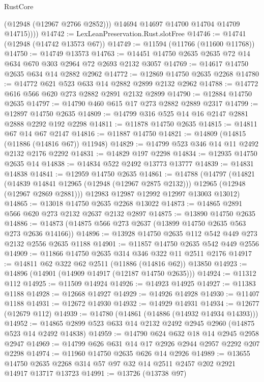 \begin{lexlean}{RustCore}
\begin{coremodule}
              (@12948 (@12967 @2766 @2852)))
            @14694
            @14697
            @14700
            @14704
            @14709
            @14715))))
@14742 := LexLeanPreservation.Rust.slotFree
@14746 := @14741 (@12948 (@14742 @13573 @67))
@14749 := @11594 (@11766 (@11600 @11768))
@14750 := @14749 @13573
@14763 := @14451 @14750 @2635 @2635 @72 @14 @634 @670 @303 @2964 @72 @2693 @2132 @3057
@14769 := @14617 @14750 @2635 @634 @14 @2882 @2962
@14772 := @12869 @14750 @2635 @2268
@14780 := @14772 @621 @523 @633 @14 @2882 @2899 @2132 @2962
@14788 := @14772 @616 @566 @620 @273 @2882 @2891 @2132 @2899
@14790 := @12884 @14750 @2635
@14797 := @14790 @460 @615 @17 @273 @2882 @2889 @2317
@14799 := @12897 @14750 @2635
@14809 := @14799 @316 @525 @14 @16 @2147 @2881 @2888 @2292 @192 @2298
@14811 := @11878 @14750 @2635
@14815 := @14811 @67 @14 @67 @2147
@14816 := @11887 @14750
@14821 := @14809 (@14815 (@11886 (@14816 @67)) @11948)
@14829 := @14799 @523 @346 @14 @11 @2492 @2132 @2176 @2292
@14831 := @14829 @197 @2298
@14834 := @12935 @14750 @2635 @14
@14838 := @14834 @522 @2492 @13773 @13777
@14839 := @14831 @14838
@14841 := @12959 @14750 @2635
@14861 := @14788
    (@14797
      (@14821
        (@14839 @14841 @12965 (@12948 (@12967 @2875 @2132)))
        @12965
        (@12948 (@12967 @2869 @2881)))
      @12983
      @12987
      @12992
      @12997
      @13003
      @13012)
@14865 := @13018 @14750 @2635 @2268 @13022
@14873 := @14865 @2891 @566 @620 @273 @2132 @2637 @2132 @2897
@14875 := @13890 @14750 @2635
@14886 := @14873 (@14875 @566 @273 @2637 (@13899 @14750 @2635 @563 @273 @2636 @14166))
@14896 := @13928 @14750 @2635 @112 @542 @449 @273 @2132 @2556 @2635 @1188
@14901 := @11857 @14750 @2635 @542 @449 @2556
@14909 := @11866 @14750 @2635 @314 @346 @322 @11 @2511 @2176
@14917 := @14811 @62 @322 @62 @2511 (@11886 (@14816 @62)) @13850
@14923 := @14896 (@14901 (@14909 @14917 (@12187 @14750 @2635)))
@14924 := @11312 @112
@14925 := @11509 @14924
@14926 := @14923 @14925
@14927 := @11383 @1188
@14928 := @12668 @14927
@14929 := @14926 @14928
@14930 := @11407 @1188
@14931 := @12672 @14930
@14932 := @14929 @14931
@14934 := @12677 (@12679 @112)
@14939 := @14780 (@14861 (@14886 (@14932 @14934 @14393)))
@14952 := @14865 @2899 @523 @633 @14 @2132 @2492 @2945 @2960 (@14875 @523 @14 @2492 @14838)
@14959 := @14790 @624 @632 @18 @14 @2945 @2958 @2947
@14969 := @14799 @626 @631 @14 @17 @2926 @2944 @2957 @2292 @207 @2298
@14974 := @11960 @14750 @2635 @626 @14 @2926
@14989 := @13655 @14750 @2635 @2268 @314 @57 @97 @32 @14 @2511 @2457 @202 @2921 @14917 @13717 @13723
@14991 := @13726 (@13738 @97)

\end{coremodule}
\end{lexlean}
